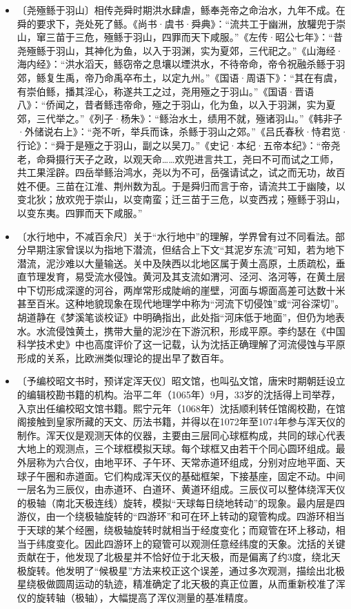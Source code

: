 \documentclass[12pt,UTF-8,openany,a4]{ctexbook}
\begin{document}
\begin{itemize}
    \item〔尧殛鲧于羽山〕{\yiwen 相传尧舜时期洪水肆虐，鲧奉尧帝之命治水，九年不成。在舜的要求下，尧处死了鲧。《尚书·虞书·舜典》：“流共工于幽洲，放驩兜于崇山，窜三苗于三危，殛鲧于羽山，四罪而天下咸服。”《左传·昭公七年》：“昔尧殛鲧于羽山，其神化为鱼，以入于羽渊，实为夏郊，三代祀之。”《山海经·海内经》：“洪水滔天，鲧窃帝之息壤以堙洪水，不待帝命，帝令祝融杀鲧于羽郊，鲧复生禹，帝乃命禹卒布土，以定九州。”《国语·周语下》：“其在有虞，有崇伯鲧，播其淫心，称遂共工之过，尧用殛之于羽山。”《国语·晋语八》：“侨闻之，昔者鲧违帝命，殛之于羽山，化为鱼，以入于羽渊，实为夏郊，三代举之。”《列子·杨朱》：“鲧治水土，绩用不就，殛诸羽山。”《韩非子·外储说右上》：“尧不听，举兵而诛，杀鲧于羽山之郊。”《吕氏春秋·恃君览·行论》：“舜于是殛之于羽山，副之以吴刀。”《史记·本纪·五帝本纪》：“帝尧老，命舜摄行天子之政，以观天命……欢兜进言共工，尧曰不可而试之工师，共工果淫辟。四岳举鲧治鸿水，尧以为不可，岳强请试之，试之而无功，故百姓不便。三苗在江淮、荆州数为乱。于是舜归而言于帝，请流共工于幽陵，以变北狄；放欢兜于崇山，以变南蛮；迁三苗于三危，以变西戎；殛鲧于羽山，以变东夷。四罪而天下咸服。”}
    \item〔水行地中，不减百余尺〕{\yiwen 关于“水行地中”的理解，学界曾有过不同看法。部分早期注家曾误以为指地下潜流，但结合上下文“其泥岁东流”可知，若为地下潜流，泥沙难以大量输送。关中及陕西以北地区属于黄土高原，土质疏松，垂直节理发育，易受流水侵蚀。黄河及其支流如渭河、泾河、洛河等，在黄土层中下切形成深邃的河谷，两岸常形成陡峭的崖壁，河面与塬面高差可达数十米甚至百米。这种地貌现象在现代地理学中称为“河流下切侵蚀”或“河谷深切”。胡道静在《梦溪笔谈校证》中明确指出，此处指“河床低于地面”，但仍为地表水。水流侵蚀黄土，携带大量的泥沙在下游沉积，形成平原。李约瑟在《中国科学技术史》中也高度评价了这一记载，认为沈括正确理解了河流侵蚀与平原形成的关系，比欧洲类似理论的提出早了数百年。}
    \item〔予编校昭文书时，预详定浑天仪〕{\yiwen 昭文馆，也叫弘文馆，唐宋时期朝廷设立的编辑校勘书籍的机构。治平二年（1065年）9月，33岁的沈括得上司举荐，入京出任编校昭文馆书籍。熙宁元年（1068年）沈括顺利转任馆阁校勘，在馆阁接触到皇家所藏的天文、历法书籍，并得以在1072年至1074年参与浑天仪的制作。浑天仪是观测天体的仪器，主要由三层同心球框构成，共同的球心代表大地上的观测点，三个球框模拟天球。每个球框又由若干个同心圆环组成。最外层称为六合仪，由地平环、子午环、天常赤道环组成，分别对应地平面、天球子午圈和赤道面。它们构成浑天仪的基础框架，下接基座，固定不动。中间一层名为三辰仪，由赤道环、白道环、黄道环组成。三辰仪可以整体绕浑天仪的极轴（南北天极连线）旋转，模拟“天球每日绕地转动”的现象。最内层是四游仪，由一个绕极轴旋转的“四游环”和可在环上转动的窥管构成。四游环相当于天球的某个经圈，绕极轴旋转时就相当于经度变化；而窥管在环上移动，相当于纬度变化。因此四游环上的窥管可以观测任意经纬度的天象。沈括的关键贡献在于，他发现了北极星并不恰好位于北天极，而是偏离了约3度，绕北天极旋转。他发明了“候极星”方法来校正这个误差，通过多次观测，描绘出北极星绕极做圆周运动的轨迹，精准确定了北天极的真正位置，从而重新校准了浑仪的旋转轴（极轴），大幅提高了浑仪测量的基准精度。}
\end{itemize}
\end{document}
